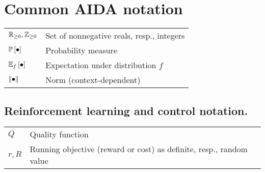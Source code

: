 \documentclass[12pt,twoside]{../../mitthesis}
\begin{document}
\section{Common AIDA notation}
\begin{tabularx}{0.97\textwidth}{ |p{}|p{}| }  
\hline
$\R_{\ge 0}, \Z_{\ge 0}$ & Set of nonnegative reals, resp., integers \\ 
$\PP{\bullet}$ & Probability measure \\
$\E[f]{\bullet}$ & Expectation under distribution $f$ \\
$\nrm{\bullet}$ & Norm (context-dependent) \\
\hline
\end{tabularx}
\subsection{Reinforcement learning and control notation.}
\begin{tabularx}{0.97\textwidth}{ |p{}|p{}| }  
\hline
$Q$ & Quality function \\ 
$r, R$ & Running objective (reward or cost) as definite, resp., random value\\
\hline
\end{tabularx}
\end{document}
